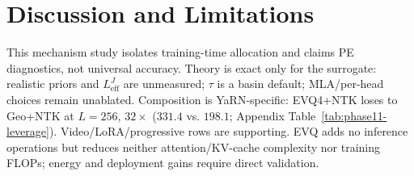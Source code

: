 \section{Discussion and Limitations}
\label{sec:limitations}

This mechanism study isolates training-time allocation and claims PE diagnostics, not universal accuracy. Theory is exact only for the surrogate: realistic priors and $L_{\mathrm{eff}}^{J}$ are unmeasured; $\tau$ is a basin default; MLA/per-head choices remain unablated. Composition is YaRN-specific: EVQ4+NTK loses to Geo+NTK at $L{=}256$, $32\times$ ($331.4$ vs. $198.1$; Appendix Table~\ref{tab:phase11-leverage}). Video/LoRA/progressive rows are supporting. EVQ adds no inference operations but reduces neither attention/KV-cache complexity nor training FLOPs; energy and deployment gains require direct validation.
